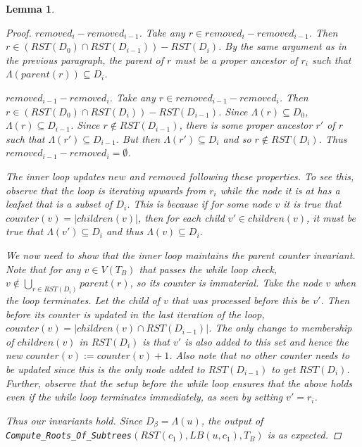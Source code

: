 \documentclass{article}
\newcommand{\leafset}{\Lambda}
\newtheorem{computerootsofsubtreescorrectness}[incompatibility]{Lemma}
\begin{document}
\begin{computerootsofsubtreescorrectness}
\begin{proof}
            \textit{$removed_i - removed_{i-1}$.} Take any $r \in removed_i - removed_{i-1}$. Then $r \in (RST(D_0) \cap RST(D_{i-1})) - RST(D_i)$. By the same argument as in the previous paragraph, the parent of $r$ must be a proper ancestor of $r_i$ such that $\leafset(parent(r)) \subseteq D_i$.

            \textit{$removed_{i-1} - removed_i$.} Take any $r \in removed_{i-1} - removed_i$. Then $r \in (RST(D_0) \cap RST(D_i)) - RST(D_{i-1})$. Since $\leafset(r) \subseteq D_0$, $\leafset(r) \subseteq D_{i-1}$. Since $r \not\in RST(D_{i-1})$, there is some proper ancestor $r'$ of $r$ such that $\leafset(r') \subseteq D_{i-1}$. But then $\leafset(r') \subseteq D_i$ and so $r \not\in RST(D_i)$. Thus $removed_{i-1} - removed_i = \emptyset$.

            The inner loop updates $new$ and $removed$ following these properties. To see this, observe that the loop is iterating upwards from $r_i$ while the node it is at has a leafset that is a subset of $D_i$. This is because if for some node $v$ it is true that $counter(v) = |children(v)|$, then for each child $v' \in children(v)$, it must be true that $\leafset(v') \subseteq D_i$ and thus $\leafset(v) \subseteq D_i$.

            We now need to show that the inner loop maintains the parent counter invariant. Note that for any $v \in V(T_B)$ that passes the while loop check, $v \not\in \bigcup_{r \in RST(D_i)} parent(r)$, so its counter is immaterial. Take the node $v$ when the loop terminates. Let the child of $v$ that was processed before this be $v'$. Then before its counter is updated in the last iteration of the loop, $counter(v) = |children(v) \cap RST(D_{i-1})|$. The only change to membership of $children(v)$ in $RST(D_i)$ is that $v'$ is also added to this set and hence the new $counter(v) := counter(v) + 1$. Also note that no other counter needs to be updated since this is the only node added to $RST(D_{i-1})$ to get $RST(D_i)$. Further, observe that the setup before the while loop ensures that the above holds even if the while loop terminates immediately, as seen by setting $v' = r_i$.

            Thus our invariants hold. Since $D_{\beta} = \leafset(u)$, the output of\\ %
            \texttt{Compute\_Roots\_Of\_Subtrees}$(RST(c_1), LB(u, c_1), T_B)$ is as expected.
        \end{proof}
    \end{computerootsofsubtreescorrectness}
\end{document}
